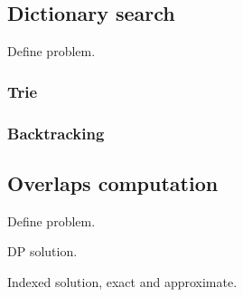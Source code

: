 
\subsection{Dictionary search}

Define problem.

\subsubsection{Trie}

\subsubsection{Backtracking}


\subsection{Overlaps computation}

Define problem.

DP solution.

Indexed solution, exact and approximate.


